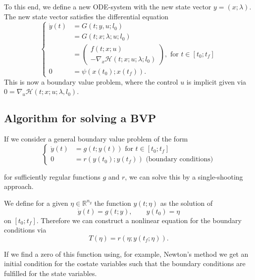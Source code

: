 \documentclass[a4paper]{article}
\theoremstyle{definitions}
\theoremstyle{bemerkung}
\theoremstyle{satz}
\theoremstyle{satz}
\begin{document}
To this end, we define a new ODE-system with the new state vector $y = (x;\lambda)$. The new state vector satisfies the differential equation
    \begin{equation}
    \left\{
    \begin{aligned}
        \dot{y}(t) &= G(t;y,u;l_0) \\
        &= G(t;x;\lambda;u;l_0) \\
        &= \begin{pmatrix}
            f(t;x;u) \\
            -\nabla_x \mathcal{H}(t;x;u;\lambda;l_0)
\end{pmatrix}, \text{ for } t \in [t_0; t_f] \\
        0 &= \psi(x(t_0);x(t_f)).
    \end{aligned}
    \right.
    \tag{BVP}
    \end{equation}
This is now a boundary value problem, where the control $u$ is implicit given via $0 = \nabla_u \mathcal{H}(t;x;u;\lambda, l_0)$.

    \subsection{Algorithm for solving a BVP}

    If we consider a general boundary value problem of the form 
     \begin{equation}
    \left\{
    \begin{aligned}
        \dot{y}(t) &= g(t;y(t)) \text{ for } t \in [t_0; t_f] \\
        0 &= r(y(t_0);y(t_f)) \text{ (boundary conditions)}
    \end{aligned}
    \right.
    \end{equation}

    for sufficiently regular functions $g$ and $r$, we can solve this by a single-shooting approach.

    We define for a given $\eta\in \mathbb{R}^{n_y}$ the function $y(t;\eta)$ as the solution of 
    \[\dot{y}(t) = g(t;y), \qquad y(t_0) = \eta\]
    on $[t_0;t_f]$. Therefore we can construct a nonlinear equation for the boundary conditions via\[ T(\eta) = r(\eta; y(t_f;\eta)).\]

    If we find a zero of this function using, for example, Newton's method we get an initial condition for the costate variables such that the boundary conditions are fulfilled for the state variables.
\end{document}
